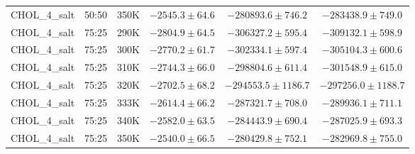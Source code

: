 \begin{longtable}{|c|c|c|c|c|c|}
CHOL\_4\_salt & 50:50 & 350K & $-2545.3 \pm 64.6$ & $-280893.6 \pm 746.2$ & $-283438.9 \pm 749.0$ \\
CHOL\_4\_salt & 75:25 & 290K & $-2804.9 \pm 64.5$ & $-306327.2 \pm 595.4$ & $-309132.1 \pm 598.9$ \\
CHOL\_4\_salt & 75:25 & 300K & $-2770.2 \pm 61.7$ & $-302334.1 \pm 597.4$ & $-305104.3 \pm 600.6$ \\
CHOL\_4\_salt & 75:25 & 310K & $-2744.3 \pm 66.0$ & $-298804.6 \pm 611.4$ & $-301548.9 \pm 615.0$ \\
CHOL\_4\_salt & 75:25 & 320K & $-2702.5 \pm 68.2$ & $-294553.5 \pm 1186.7$ & $-297256.0 \pm 1188.7$ \\
CHOL\_4\_salt & 75:25 & 333K & $-2614.4 \pm 66.2$ & $-287321.7 \pm 708.0$ & $-289936.1 \pm 711.1$ \\
CHOL\_4\_salt & 75:25 & 340K & $-2582.0 \pm 63.5$ & $-284443.9 \pm 690.4$ & $-287025.9 \pm 693.3$ \\
CHOL\_4\_salt & 75:25 & 350K & $-2540.0 \pm 66.5$ & $-280429.8 \pm 752.1$ & $-282969.8 \pm 755.0$ \\
\end{longtable}
\normalsize
\normalsize
